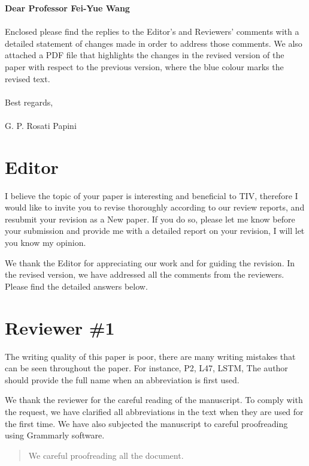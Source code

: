 \documentclass{article}
\def\Editor{Dear Professor Fei-Yue Wang\\}
\def\Letter{Enclosed please find the replies to the Editor's and Reviewers' comments with a detailed statement of changes made in order to address those comments. We also attached a PDF file that highlights the changes in the revised version of the paper with respect to the previous version, where the blue colour marks the revised text.
	\\ \\
	Best regards,\\
	\\
	G. P. Rosati Papini
}
\providecommand{\Editor}{Name}
\providecommand{\Letter}{Body}
\begin{document}
{\Large\bf \Editor}\\[1em]
{\large\Letter}\\[1em]
\newpage
\headall


\section{Editor}

\RC I believe the topic of your paper is interesting and beneficial to TIV, therefore I would like to invite you to revise thoroughly according to our review reports, and resubmit your revision as a New paper. If you do so, please let me know before your submission and provide me with a detailed report on your revision, I will let you know my opinion.

\AR We thank the Editor for appreciating our work and for guiding the revision. In the revised version, we have addressed all the comments from the reviewers. Please find the detailed answers below.




\newpage
\headall

\section{Reviewer \#1}

\RC The writing quality of this paper is poor, there are many writing mistakes that can be seen throughout the paper. For instance, P2, L47, LSTM, The author should provide the full name when an abbreviation is first used.

\AR We thank the reviewer for the careful reading of the manuscript. To comply with the request, we have clarified all abbreviations in the text when they are used for the first time.
We have also subjected the manuscript to careful proofreading using Grammarly software. 


\begin{quote}
    We careful proofreading all the document.
\end{quote}
\end{document}
